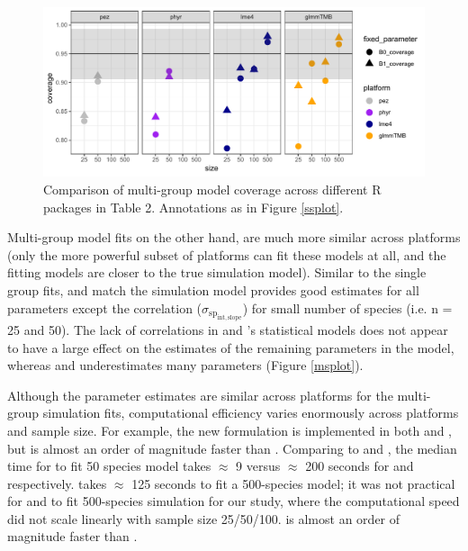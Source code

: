 \documentclass[12pt]{article}
\begin{document}
\begin{center}
\begin{figure}[H]
  \includegraphics[scale=0.8]{./figure/mscoverage.pdf}
  \caption{Comparison of multi-group model coverage across different R packages in Table 2. Annotations as in Figure \ref{ssplot}.}
  \label{msplot_coverage}
\end{figure}
\end{center}


Multi-group model fits on the other hand, are much more similar across platforms (only the more powerful subset of platforms can fit these models at all, and the fitting models are closer to the true simulation model).
Similar to the single group fits,  and  match the simulation model provides good estimates for all parameters except the correlation ($\sigma_{\mathrm{sp_{int,slope}}}$) for small number of species (i.e. n = 25 and 50).
The lack of correlations in  and 's statistical models does not appear to have a large effect on the estimates of the remaining parameters in the model, whereas  and  underestimates many parameters (Figure \ref{msplot}).

Although the parameter estimates are similar across platforms for the multi-group simulation fits, computational efficiency varies enormously across platforms and sample size.
For example, the new formulation is implemented in both  and , but  is almost an order of magnitude faster than .
Comparing  to  and , the median time for  to fit 50 species model takes $\approx$ 9 versus $\approx$ 200 seconds for  and  respectively. 
 takes $\approx$ 125 seconds to fit a 500-species model; it was not practical for  and  to fit 500-species simulation for our study, where the computational speed did not scale linearly with sample size 25/50/100.
 is almost an order of magnitude faster than .
\end{document}
